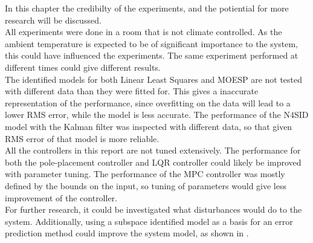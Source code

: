 In this chapter the credibilty of the experiments, and the potiential for more research will be discussed.\\
All experiments were done in a room that is not climate controlled. As the ambient temperature is expected to be of significant importance to the system, this could have influenced the experiments. The same experiment performed at different times could give different results.\\
The identified models for both Linear Least Squares and MOESP are not tested with different data than they were fitted for. This gives a inaccurate representation of the performance, since overfitting on the data will lead to a lower RMS error, while the model is less accurate. The performance of the N4SID model with the Kalman filter was inspected with different data, so that given RMS error of that model is more reliable.\\
All the controllers in this report are not tuned extensively. The performance for both the pole-placement controller and LQR controller could likely be improved with parameter tuning. The performance of the MPC controller was mostly defined by the bounds on the input, so tuning of parameters would give less improvement of the controller.\\

For further research, it could be investigated what disturbances would do to the system. Additionally, using a subspace identified model as a basis for an error prediction method could improve the system model, as shown in \cite{1184569}.